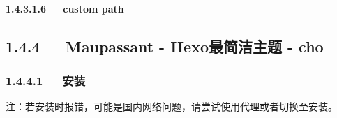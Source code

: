 \documentclass[letterpaper,12pt,english]{sphinxmanual}
\begin{document}
\paragraph{1.4.3.1.6   custom path}
\label{\detokenize{001software/001install/001._u7f51_u7ad9/hexo:custom-path}}

\subsection{1.4.4   Maupassant - Hexo最简洁主题 - cho}
\label{\detokenize{001software/001install/001._u7f51_u7ad9/hexo:maupassant-hexo-cho}}


\subsubsection{1.4.4.1   安装}
\label{\detokenize{001software/001install/001._u7f51_u7ad9/hexo:id6}}
注：若安装时报错，可能是国内网络问题，请尝试使用代理或者切换至安装。 
\end{document}
